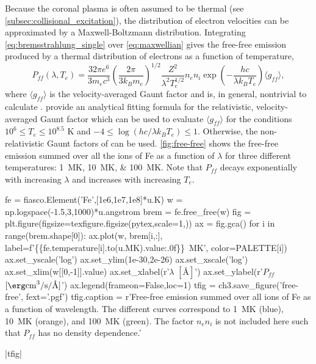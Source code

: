 Because the coronal plasma is often assumed to be thermal (see \autoref{subsec:collisional_excitation}), the distribution of electron velocities can be approximated by a Maxwell-Boltzmann distribution. Integrating \autoref{eq:bremsstrahlung_single} over \autoref{eq:maxwellian} gives the free-free emission produced by a thermal distribution of electrons as a function of temperature,
\begin{equation}\label{eq:bremsstrahlung}
    P_{ff}(\lambda,T_e) = \frac{32\pi e^6}{3m_ec^3}\left(\frac{2\pi}{3k_Bm_e}\right)^{1/2}\frac{Z^2}{\lambda^2T_e^{1/2}}n_en_i\exp{\left(-\frac{hc}{\lambda k_BT_e}\right)}\langle g_{ff}\rangle,
\end{equation}
where $\langle g_{ff}\rangle$ is the velocity-averaged Gaunt factor and is, in general, nontrivial to calculate \citep{rybicki_radiative_1979}. \citet{itoh_relativistic_2000} provide an analytical fitting formula for the relativistic, velocity-averaged Gaunt factor which can be used to evaluate $\langle g_{ff}\rangle$ for the conditions $10^6\le T_e\le10^{8.5}$ \si{\kelvin} and $-4\le\log{(hc/\lambda k_BT_e)}\le1$. Otherwise, the non-relativistic Gaunt factors of \citet{sutherland_accurate_1998} can be used. \autoref{fig:free-free} shows the free-free emission summed over all the ions of Fe as a function of $\lambda$ for three different temperatures: \SIlist{1;10;100}{\mega\kelvin}. Note that $P_{ff}$ decays exponentially with increasing $\lambda$ and increases with increasing $T_e$.

\begin{pycode}[chapter3]
fe = fiasco.Element('Fe',[1e6,1e7,1e8]*u.K)
w = np.logspace(-1.5,3,1000)*u.angstrom
brem = fe.free_free(w)
fig = plt.figure(figsize=texfigure.figsize(pytex,scale=1,))
ax = fig.gca()
for i in range(brem.shape[0]):
    ax.plot(w, brem[i,:], 
            label=f'\SI{{{fe.temperature[i].to(u.MK).value:.0f}}}{{\mega\kelvin}}',
            color=PALETTE[i])
ax.set_yscale('log')
ax.set_ylim(1e-30,2e-26)
ax.set_xscale('log')
ax.set_xlim(w[[0,-1]].value)
ax.set_xlabel(r'$\lambda$ $[\si{\angstrom}]$')
ax.set_ylabel(r'$P_{ff}$ $[\si{\erg\cubic\cm\per\second\per\angstrom}]$')
ax.legend(frameon=False,loc=1)
tfig = ch3.save_figure('free-free', fext='.pgf')
tfig.caption = r'Free-free emission summed over all ions of Fe as a function of wavelength. The different curves correspond to \SI{1}{\mega\kelvin} (blue), \SI{10}{\mega\kelvin} (orange), and \SI{100}{\mega\kelvin} (green). The factor $n_en_i$ is not included here such that $P_{ff}$ has no density dependence.'
\end{pycode}
\py[chapter3]|tfig|

